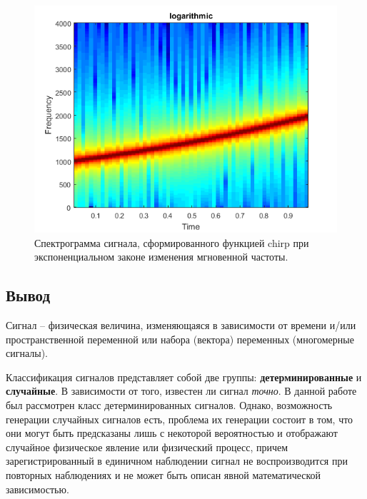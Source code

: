 \documentclass[12pt,a4paper]{article}
\begin{document}
\begin{figure}[H]
  \centering
  \includegraphics[scale=0.8]{img_chirp3}
  \caption{Спектрограмма сигнала, сформированного функцией chirp при экспоненциальном законе изменения мгновенной частоты.}
  \label{fig:img_chirp3}
\end{figure}
%

\subsection{Вывод}
Сигнал – физическая величина, изменяющаяся в зависимости от времени и/или пространственной переменной или набора (вектора) переменных (многомерные сигналы).

Классификация сигналов представляет собой две группы: \textbf{детерминированные} и \textbf{случайные}. В зависимости от того, известен ли сигнал \emph{точно}. 
В данной работе был рассмотрен класс детерминированных сигналов. Однако, возможность генерации случайных сигналов есть, проблема их генерации состоит в том, что они могут быть предсказаны лишь с некоторой вероятностью и отображают случайное физическое явление или физический процесс, причем зарегистрированный в единичном наблюдении сигнал не воспроизводится при повторных наблюдениях и не может быть описан явной математической зависимостью.
\end{document}
